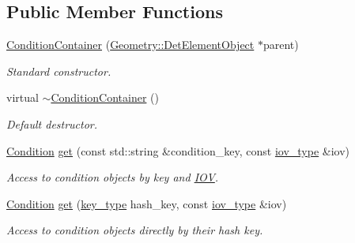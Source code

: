 \subsection*{Public Member Functions}
\begin{DoxyCompactItemize}
\item 
\hyperlink{class_d_d4hep_1_1_conditions_1_1_interna_1_1_condition_container_a766c849d73bfff4a401fc002a75c7594}{Condition\+Container} (\hyperlink{class_d_d4hep_1_1_geometry_1_1_det_element_object}{Geometry\+::\+Det\+Element\+Object} $\ast$parent)
\begin{DoxyCompactList}\small\item\em Standard constructor. \end{DoxyCompactList}\item 
virtual \hyperlink{class_d_d4hep_1_1_conditions_1_1_interna_1_1_condition_container_a18cfd1f77eea4ae5fdf3a46ed8aa61ea}{$\sim$\+Condition\+Container} ()
\begin{DoxyCompactList}\small\item\em Default destructor. \end{DoxyCompactList}\item 
\hyperlink{class_d_d4hep_1_1_conditions_1_1_condition}{Condition} \hyperlink{class_d_d4hep_1_1_conditions_1_1_interna_1_1_condition_container_ada5a5cdd50a235e4fd239c4bec4f721b}{get} (const std\+::string \&condition\+\_\+key, const \hyperlink{class_d_d4hep_1_1_conditions_1_1_interna_1_1_condition_container_aa697bd92da7a05031b5eef63bb9f000b}{iov\+\_\+type} \&iov)
\begin{DoxyCompactList}\small\item\em Access to condition objects by key and \hyperlink{class_d_d4hep_1_1_i_o_v}{I\+OV}. \end{DoxyCompactList}\item 
\hyperlink{class_d_d4hep_1_1_conditions_1_1_condition}{Condition} \hyperlink{class_d_d4hep_1_1_conditions_1_1_interna_1_1_condition_container_a49d51d2eee6ff6d8d5f959338a719725}{get} (\hyperlink{class_d_d4hep_1_1_conditions_1_1_interna_1_1_condition_container_a7a4545b4b0536565feb7346bd97c63fa}{key\+\_\+type} hash\+\_\+key, const \hyperlink{class_d_d4hep_1_1_conditions_1_1_interna_1_1_condition_container_aa697bd92da7a05031b5eef63bb9f000b}{iov\+\_\+type} \&iov)
\begin{DoxyCompactList}\small\item\em Access to condition objects directly by their hash key. \end{DoxyCompactList}\item 

\end{DoxyCompactItemize}
